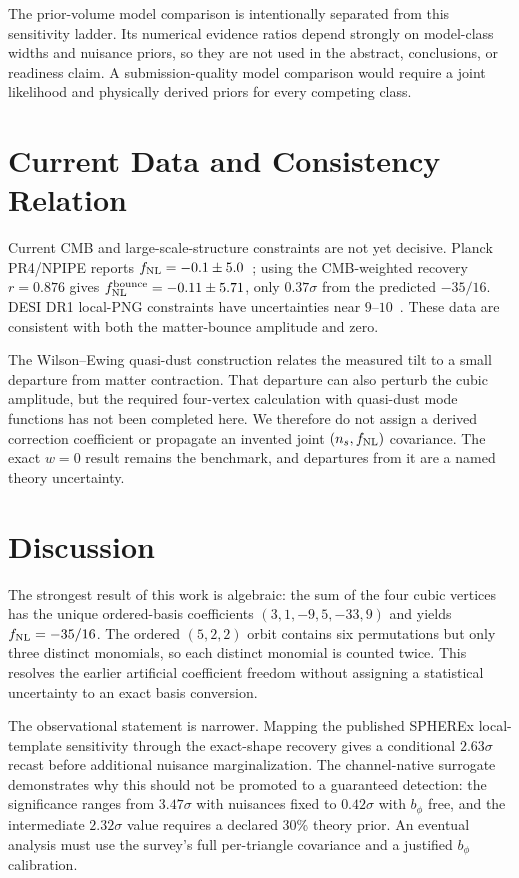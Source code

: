 \documentclass[aps,prd,twocolumn,superscriptaddress,showpacs,preprintnumbers,nofootinbib,longbibliography,floatfix]{revtex4-2}
\newcommand{\fnl}{f_{\rm NL}}
\begin{document}
The prior-volume model comparison is intentionally separated from this sensitivity ladder. Its numerical evidence ratios depend strongly on model-class widths and nuisance priors, so they are not used in the abstract, conclusions, or readiness claim. A submission-quality model comparison would require a joint likelihood and physically derived priors for every competing class.
\section{Current Data and Consistency Relation}
\label{sec:currentdata}

Current CMB and large-scale-structure constraints are not yet decisive. Planck PR4/NPIPE reports $\fnl=-0.1\pm5.0$~\cite{Jung2025PlanckPR4fNL}; using the CMB-weighted recovery $r=0.876$ gives $\fnl^{\rm bounce}=-0.11\pm5.71$, only $0.37\sigma$ from the predicted $-35/16$. DESI DR1 local-PNG constraints have uncertainties near $9$--$10$~\cite{Chaussidon2024DESIDR1fNL,Fondi2025DESIQSOassembly}. These data are consistent with both the matter-bounce amplitude and zero.

The Wilson--Ewing quasi-dust construction relates the measured tilt to a small departure from matter contraction. That departure can also perturb the cubic amplitude, but the required four-vertex calculation with quasi-dust mode functions has not been completed here. We therefore do not assign a derived correction coefficient or propagate an invented joint $(n_s,\fnl)$ covariance. The exact $w=0$ result remains the benchmark, and departures from it are a named theory uncertainty.

\section{Discussion}
\label{sec:discussion}

The strongest result of this work is algebraic: the sum of the four cubic vertices has the unique ordered-basis coefficients $(3,1,-9,5,-33,9)$ and yields $\fnl=-35/16$. The ordered $(5,2,2)$ orbit contains six permutations but only three distinct monomials, so each distinct monomial is counted twice. This resolves the earlier artificial coefficient freedom without assigning a statistical uncertainty to an exact basis conversion.

The observational statement is narrower. Mapping the published SPHEREx local-template sensitivity through the exact-shape recovery gives a conditional $2.63\sigma$ recast before additional nuisance marginalization. The channel-native surrogate demonstrates why this should not be promoted to a guaranteed detection: the significance ranges from $3.47\sigma$ with nuisances fixed to $0.42\sigma$ with $b_\phi$ free, and the intermediate $2.32\sigma$ value requires a declared 30\% theory prior. An eventual analysis must use the survey's full per-triangle covariance and a justified $b_\phi$ calibration.
\end{document}
